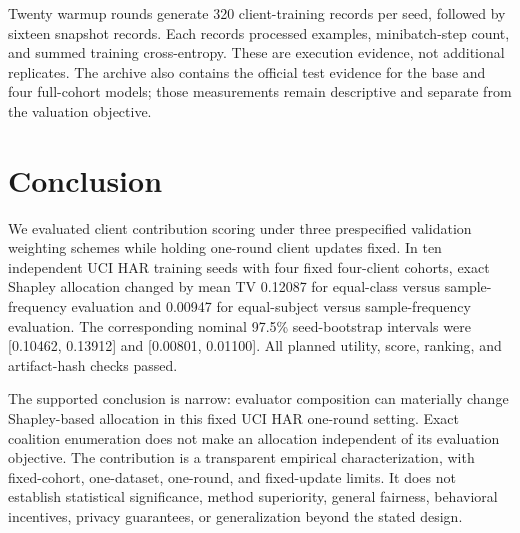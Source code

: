 \documentclass[conference,letterpaper]{IEEEtran}
\begin{document}
Twenty warmup rounds generate 320 client-training records per seed, followed by sixteen snapshot records. Each records processed examples, minibatch-step count, and summed training cross-entropy. These are execution evidence, not additional replicates. The archive also contains the official test evidence for the base and four full-cohort models; those measurements remain descriptive and separate from the valuation objective.

\section{Conclusion}
We evaluated client contribution scoring under three prespecified validation weighting schemes while holding one-round client updates fixed. In ten independent UCI HAR training seeds with four fixed four-client cohorts, exact Shapley allocation changed by mean TV 0.12087 for equal-class versus sample-frequency evaluation and 0.00947 for equal-subject versus sample-frequency evaluation. The corresponding nominal 97.5\% seed-bootstrap intervals were [0.10462, 0.13912] and [0.00801, 0.01100]. All planned utility, score, ranking, and artifact-hash checks passed.

The supported conclusion is narrow: evaluator composition can materially change Shapley-based allocation in this fixed UCI HAR one-round setting. Exact coalition enumeration does not make an allocation independent of its evaluation objective. The contribution is a transparent empirical characterization, with fixed-cohort, one-dataset, one-round, and fixed-update limits. It does not establish statistical significance, method superiority, general fairness, behavioral incentives, privacy guarantees, or generalization beyond the stated design.
\end{document}
